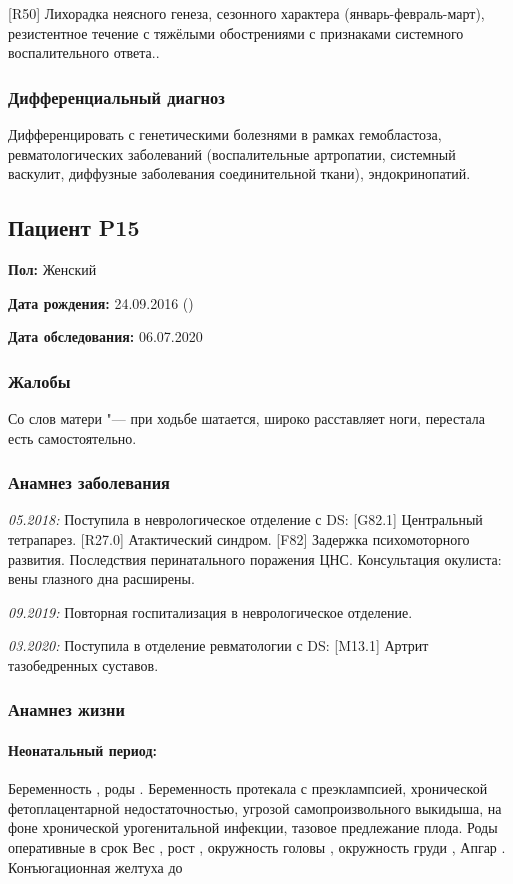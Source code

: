 \documentclass[a4paper,14pt]{extarticle}
\newcommand{\gramm}{г}
\newcommand{\cm}{см}
\newcommand{\months}{мес.}
\newcommand{\weeks}{нед.}
\newcommand{\pdate}[1]{\emph{#1:} }
\newcommand{\DS}[2]{[#2] #1}
\begin{document}
\DS{Лихорадка неясного генеза, сезонного характера (январь-февраль-март), резистентное течение с тяжёлыми обострениями с признаками системного воспалительного ответа}{R50}..

\subsubsection*{Дифференциальный диагноз}

Дифференцировать с генетическими болезнями в рамках гемобластоза, ревматологических заболеваний (воспалительные артропатии, системный васкулит, диффузные заболевания соединительной ткани), эндокринопатий.

\newpage
\subsection*{Пациент P15}

\textbf{Пол:} Женский

\textbf{Дата рождения:} 24.09.2016 ()

\textbf{Дата обследования:} 06.07.2020

\subsubsection*{Жалобы}

Со слов матери "--- при ходьбе шатается, широко расставляет ноги, перестала есть самостоятельно.

\subsubsection*{Анамнез заболевания}

\pdate{05.2018} Поступила в неврологическое отделение с DS: \DS{Центральный тетрапарез}{G82.1}. \DS{Атактический синдром}{R27.0}. \DS{Задержка психомоторного развития}{F82}. Последствия перинатального поражения ЦНС. 
Консультация окулиста: вены глазного дна расширены.

\pdate{09.2019} Повторная госпитализация в неврологическое отделение.

\pdate{03.2020} Поступила в отделение ревматологии с DS: \DS{Артрит тазобедренных суставов}{M13.1}.

\subsubsection*{Анамнез жизни}

\paragraph{Неонатальный период:}
Беременность , роды .
Беременность протекала с преэклампсией, хронической фетоплацентарной недостаточностью, угрозой самопроизвольного выкидыша, на фоне хронической урогенитальной инфекции, тазовое предлежание плода.
Роды оперативные в срок \numprint[\weeks]{39}
Вес \numprint[\gramm]{3040}, рост \numprint[\cm]{53}, окружность головы \numprint[\cm]{34}, окружность груди \numprint[\cm]{33}, Апгар .
Конъюгационная желтуха  до \numprint[\months]{1}
\end{document}
